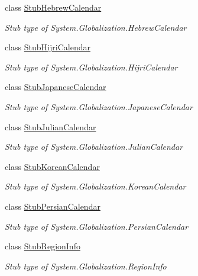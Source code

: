 \begin{DoxyCompactItemize}
class \hyperlink{class_system_1_1_globalization_1_1_fakes_1_1_stub_hebrew_calendar}{Stub\-Hebrew\-Calendar}
\begin{DoxyCompactList}\small\item\em Stub type of System.\-Globalization.\-Hebrew\-Calendar\end{DoxyCompactList}\item 
class \hyperlink{class_system_1_1_globalization_1_1_fakes_1_1_stub_hijri_calendar}{Stub\-Hijri\-Calendar}
\begin{DoxyCompactList}\small\item\em Stub type of System.\-Globalization.\-Hijri\-Calendar\end{DoxyCompactList}\item 
class \hyperlink{class_system_1_1_globalization_1_1_fakes_1_1_stub_japanese_calendar}{Stub\-Japanese\-Calendar}
\begin{DoxyCompactList}\small\item\em Stub type of System.\-Globalization.\-Japanese\-Calendar\end{DoxyCompactList}\item 
class \hyperlink{class_system_1_1_globalization_1_1_fakes_1_1_stub_julian_calendar}{Stub\-Julian\-Calendar}
\begin{DoxyCompactList}\small\item\em Stub type of System.\-Globalization.\-Julian\-Calendar\end{DoxyCompactList}\item 
class \hyperlink{class_system_1_1_globalization_1_1_fakes_1_1_stub_korean_calendar}{Stub\-Korean\-Calendar}
\begin{DoxyCompactList}\small\item\em Stub type of System.\-Globalization.\-Korean\-Calendar\end{DoxyCompactList}\item 
class \hyperlink{class_system_1_1_globalization_1_1_fakes_1_1_stub_persian_calendar}{Stub\-Persian\-Calendar}
\begin{DoxyCompactList}\small\item\em Stub type of System.\-Globalization.\-Persian\-Calendar\end{DoxyCompactList}\item 
class \hyperlink{class_system_1_1_globalization_1_1_fakes_1_1_stub_region_info}{Stub\-Region\-Info}
\begin{DoxyCompactList}\small\item\em Stub type of System.\-Globalization.\-Region\-Info\end{DoxyCompactList}\item 

\end{DoxyCompactItemize}
